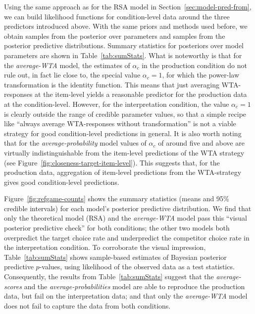 \documentclass[fleqn]{article}
\begin{document}

Using the same approach as for the RSA model in Section~\ref{sec:model-pred-from}, we can build likelihood functions for condition-level data around the three predictors introduced above.
With the same priors and methods used before, we obtain samples from the posterior over parameters and samples from the posterior predictive distributions.
Summary statistics for posteriors over model parameters are shown in Table~\ref{tab:sumStats}.
What is noteworthy is that for the \emph{average-WTA} model, the estimates of $\alpha_{c}$ in the production condition do not rule out, in fact lie close to, the special value $\alpha_{c}=1$, for which the power-law transformation is the identity function.
This means that just averaging WTA-responses at the item-level yields a reasonable predictor for the production data at the condition-level.
However, for the interpretation condition, the value $\alpha_{c}=1$ is clearly outside the range of credible parameter values, so that a simple recipe like ``always average WTA-responses without transformation'' is not a viable strategy for good condition-level predictions in general.
It is also worth noting that for the \emph{average-probability} model values of $\alpha_{c}$ of around five and above are virtually indistinguishable from the item-level predictions of the WTA strategy (see Figure~\ref{fig:closeness-target-item-level}).
This suggests that, for the production data, aggregation of item-level predictions from the WTA-strategy gives good condition-level predictions.

Figure~\ref{fig:refgame-counts} shows the summary statistics (means and 95\% credible intervals) for each model's posterior predictive distribution.
We find that only the theoretical model (RSA) and the \emph{average-WTA} model pass this ``visual posterior predictive check'' for both conditions; the other two models both overpredict the target choice rate and underpredict the competitor choice rate in the interpretation condition.
To corroborate the visual impression, Table~\ref{tab:sumStats} shows sample-based estimates of Bayesian posterior predictive $p$-values, using likelihood of the observed data as a test statistics.
Consequently, the results from Table~\ref{tab:sumStats} suggest that the \emph{average-scores} and the \emph{average-probabilities} model are able to reproduce the production data, but fail on the interpretation data; and that only the \emph{average-WTA} model does not fail to capture the data from both conditions.
\end{document}
